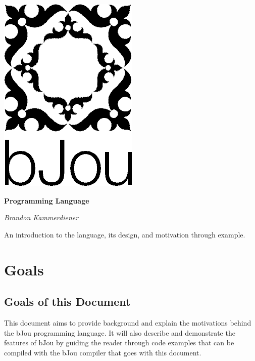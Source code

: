 \documentclass[12pt]{article}
\begin{document}
\begin{titlepage}
	\centering

	\includegraphics[scale=0.45]{black.PNG}

	\vspace{1cm}

	{\huge\bfseries Programming Language}

	\vspace{4.8cm}

	{\itshape\Large Brandon Kammerdiener}

	\vfill

	{\large An introduction to the language, its design, and motivation through example. }

\end{titlepage}

\newpage

\tableofcontents

\newpage

\section*{Goals}

	\subsection*{Goals of this Document}
		This document aims to provide background and explain the motivations behind the bJou programming language. It will also describe and demonstrate the features of bJou by guiding the reader through code examples that can be compiled with the bJou compiler that goes with this document.	
	
\end{document}
